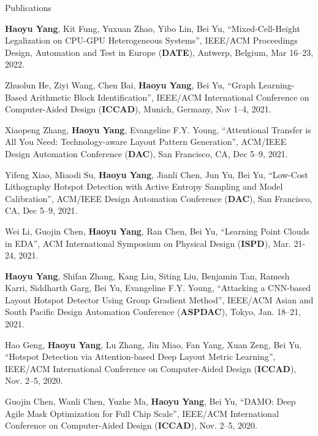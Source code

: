 \begin{rSection}{Publications}
\begin{description}[font=\normalfont]
	\item[{[C23]}] \textbf{Haoyu Yang}, Kit Fung, Yuxuan Zhao, Yibo Lin, Bei Yu,
	``Mixed-Cell-Height Legalization on CPU-GPU Heterogeneous Systems'',
	IEEE/ACM Proceedings Design, Automation and Test in Europe (\textbf{DATE}), Antwerp, Belgium, Mar 16–23, 2022.
	
	\item[{[C22]}] Zhuolun He, Ziyi Wang, Chen Bai, \textbf{Haoyu Yang}, Bei Yu, ``Graph Learning-Based Arithmetic Block Identification'',
	IEEE/ACM International Conference on Computer-Aided Design (\textbf{ICCAD}), Munich, Germany, Nov 1–4, 2021.
	
	\item[{[C21]}] Xiaopeng Zhang, \textbf{Haoyu Yang}, Evangeline F.Y. Young, ``Attentional Transfer is All You Need: Technology-aware Layout Pattern Generation'',
	ACM/IEEE Design Automation Conference (\textbf{DAC}), San Francisco, CA, Dec 5–9, 2021.
	
	
	\item[{[C20]}] Yifeng Xiao, Miaodi Su, \textbf{Haoyu Yang}, Jianli Chen, Jun Yu, Bei Yu,
	``Low-Cost Lithography Hotspot Detection with Active Entropy Sampling and Model Calibration'',
	ACM/IEEE Design Automation Conference (\textbf{DAC}), San Francisco, CA, Dec 5–9, 2021.
	
	\item[{[C19]}] Wei Li, Guojin Chen, \textbf{Haoyu Yang}, Ran Chen, Bei Yu,
	``Learning Point Clouds in EDA'', ACM International Symposium on Physical Design (\textbf{ISPD}), Mar. 21-24, 2021.

	\item[{[C18]}] \textbf{Haoyu Yang}, Shifan Zhang, Kang Liu, Siting Liu, Benjamin Tan, Ramesh Karri, Siddharth Garg, Bei Yu, Evangeline F.Y. Young,
	``Attacking a CNN-based Layout Hotspot Detector Using Group Gradient Method'', 
	IEEE/ACM Asian and South Pacific Design Automation Conference (\textbf{ASPDAC}), Tokyo, Jan. 18–21, 2021.

    \item[{[C17]}] Hao Geng, \textbf{Haoyu Yang}, Lu Zhang, Jin Miao, Fan Yang, Xuan Zeng, Bei Yu, 
    ``Hotspot Detection via Attention-based Deep Layout Metric Learning'', 
    IEEE/ACM International Conference on Computer-Aided Design (\textbf{ICCAD}), Nov. 2–5, 2020.
    
    \item[{[C16]}] Guojin Chen, Wanli Chen, Yuzhe Ma, \textbf{Haoyu Yang}, Bei Yu,
     ``DAMO: Deep Agile Mask Optimization for Full Chip Scale'', 
     IEEE/ACM International Conference on Computer-Aided Design (\textbf{ICCAD}), Nov. 2–5, 2020.
	

\end{description}
\end{rSection}
